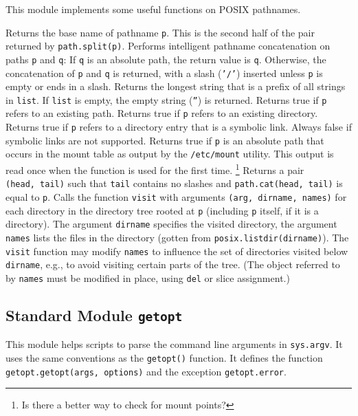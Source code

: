 This module implements some useful functions on POSIX pathnames.
\begin{description}
Returns the base name of pathname
{\tt p}.
This is the second half of the pair returned by
{\tt path.split(p)}.
Performs intelligent pathname concatenation on paths
{\tt p}
and
{\tt q}:
If
{\tt q}
is an absolute path, the return value is
{\tt q}.
Otherwise, the concatenation of
{\tt p}
and
{\tt q}
is returned, with a slash ({\tt '/'}) inserted unless
{\tt p}
is empty or ends in a slash.
Returns the longest string that is a prefix of all strings in
{\tt list}.
If
{\tt list}
is empty, the empty string ({\tt ''}) is returned.
Returns true if
{\tt p}
refers to an existing path.
Returns true if
{\tt p}
refers to an existing directory.
Returns true if
{\tt p}
refers to a directory entry that is a symbolic link.
Always false if symbolic links are not supported.
Returns true if
{\tt p}
is an absolute path that occurs in the mount table as output by the
{\tt /etc/mount}
utility.
This output is read once when the function is used for the first
time.%
\footnote{
Is there a better way to check for mount points?
}
Returns a pair
{\tt (head,~tail)}
such that
{\tt tail}
contains no slashes and
{\tt path.cat(head, tail)}
is equal to
{\tt p}.
Calls the function
{\tt visit}
with arguments
{\tt (arg, dirname, names)}
for each directory in the directory tree rooted at
{\tt p}
(including
{\tt p}
itself, if it is a directory).
The argument
{\tt dirname}
specifies the visited directory, the argument
{\tt names}
lists the files in the directory (gotten from
{\tt posix.listdir(dirname)}).
The
{\tt visit}
function may modify
{\tt names}
to influence the set of directories visited below
{\tt dirname},
e.g.,
to avoid visiting certain parts of the tree.
(The object referred to by
{\tt names}
must be modified in place, using
{\tt del}
or slice assignment.)
\end{description}

\subsection{Standard Module {\tt getopt}}

This module helps scripts to parse the command line arguments in
{\tt sys.argv}.
It uses the same conventions as the {\UNIX}
{\tt getopt()}
function.
It defines the function
{\tt getopt.getopt(args, options)}
and the exception
{\tt getopt.error}.

